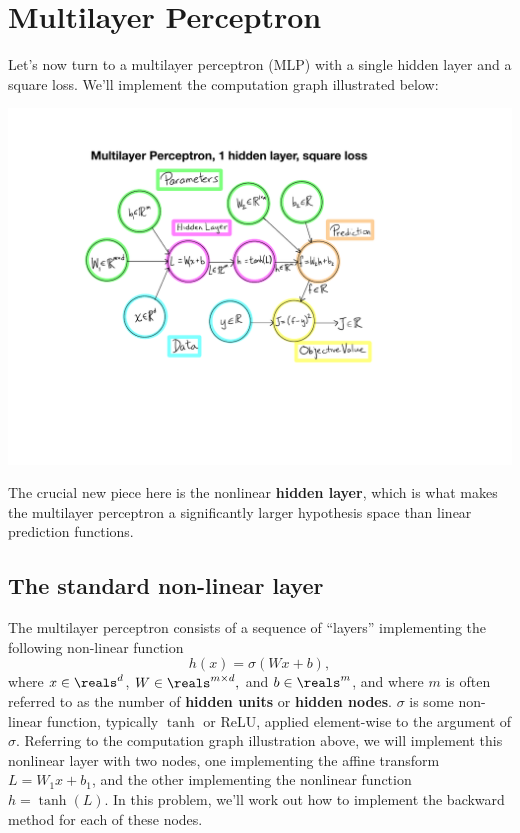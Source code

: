 \documentclass{article}
\theoremstyle{plain}
\theoremstyle{definition}
\begin{document}
\section{Multilayer Perceptron}
Let's now turn to a multilayer perceptron (MLP)
with a single hidden layer and a square loss. We'll implement the
computation graph illustrated below:
\begin{center}
\includegraphics{./MLP-computation-graph}
\par\end{center}

The crucial new piece here is the nonlinear \textbf{hidden layer},
which is what makes the multilayer perceptron a significantly larger
hypothesis space than linear prediction functions.

\subsection{The standard non-linear layer}

The multilayer perceptron consists of a sequence of ``layers'' implementing
the following non-linear function
\[
h(x)=\sigma\left(Wx+b\right),
\]
where $x\in\reals^{d}$, $W\in\reals^{m\times d},$ and $b\in\reals^{m}$,
and where $m$ is often referred to as the number of\textbf{ hidden
units }or\textbf{ hidden nodes}. $\sigma$ is some non-linear function,
typically $\tanh$ or ReLU, applied element-wise to the argument of
$\sigma$. Referring to the computation graph illustration above,
we will implement this nonlinear layer with two nodes, one implementing
the affine transform $L=W_{1}x+b_{1}$, and the other implementing
the nonlinear function $h=\tanh(L)$. In this problem, we'll work
out how to implement the backward method for each of these nodes.
\end{document}
